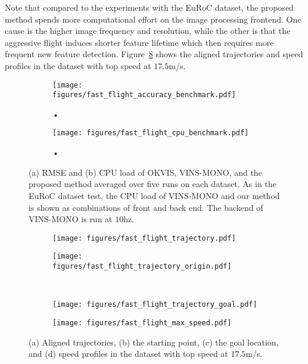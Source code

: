 Note that compared to the experiments with the EuRoC dataset, the proposed method spends more computational effort on the image processing frontend.  One cause is the higher image frequency and resolution, while the other is that the aggressive flight induces shorter feature lifetime which then requires more frequent new feature detection. Figure~\ref{fig: max speed dataset} shows the aligned trajectories and speed profiles in the dataset with top speed at $17.5$m/s.

\begin{figure}[htp]
\centering
\begin{subfigure}[b]{0.4\textwidth}
\texttt{[image: figures/fast\_flight\_accuracy\_benchmark.pdf]}
\caption{•}
\label{fig: fast flight accuracy benchmark}
\end{subfigure}
\begin{subfigure}[b]{0.4\textwidth}
\texttt{[image: figures/fast\_flight\_cpu\_benchmark.pdf]}
\caption{•}
\label{fig: fast flight cpu benchmark}
\end{subfigure}
\caption{(a) RMSE and (b) CPU load of OKVIS, VINS-MONO, and the proposed method averaged over five runs on each dataset. As in the EuRoC dataset test, the CPU load of VINS-MONO and our method is shown as combinations of front and back end. The backend of VINS-MONO is run at $10$hz.}
\label{fig: fast flight benchmark}
\end{figure}

\begin{figure}[htp]
\centering
\begin{subfigure}[b]{0.22\textwidth}
\texttt{[image: figures/fast\_flight\_trajectory.pdf]}
\caption{}
\label{fig: fast flight trajectory}
\end{subfigure}
\begin{subfigure}[b]{0.22\textwidth}
\texttt{[image: figures/fast\_flight\_trajectory\_origin.pdf]}
\caption{}
\label{fig: fast flight trajectory origin}
\end{subfigure}\\
\begin{subfigure}[b]{0.22\textwidth}
\texttt{[image: figures/fast\_flight\_trajectory\_goal.pdf]}
\caption{}
\label{fig: fast flight trajectory goal}
\end{subfigure}
\begin{subfigure}[b]{0.22\textwidth}
\texttt{[image: figures/fast\_flight\_max\_speed.pdf]}
\caption{}
\label{fig: fast flight max speed}
\end{subfigure}
\caption{(a) Aligned trajectories, (b) the starting point, (c) the goal location, and (d) speed profiles in the dataset with top speed at $17.5$m/s. }
\label{fig: max speed dataset}
\end{figure}

